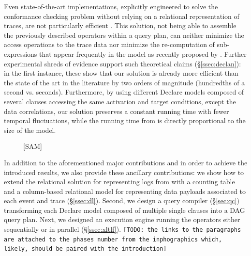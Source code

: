 Even state-of-the-art implementations, explicitly engineered to solve the conformance checking problem without relying on a 
relational representation of traces, are not particularly efficient \cite{BurattinMS16}. This solution, not being able to assemble the previously described \LTLf operators within a query plan, can neither minimize the access operations to the trace data nor  minimize the re-computation of sub-expressions that appear frequently in the model as recently proposed by \cite{BellatrecheKB21}. Further experimental shreds of evidence support such theoretical claims (\S\ref{ssec:declan}): in the first instance, these show that our solution is already more efficient than the state of the art in the literature by two orders of magnitude (hundredths of a second vs. seconds). Furthermore, by using different Declare models composed of several clauses accessing the same activation and target conditions, except the data correlations, our solution preserves a constant running time with fewer temporal fluctuations, while the running time from  \cite{BurattinMS16} is directly proportional to the size of the model.

\begin{figure}
	\caption{[SAM]}\label{fig:pipe}
\end{figure}
In addition to the aforementioned major contributions and in order to achieve the introduced results, we also provide these ancillary contributions: we show how to extend the relational solution for representing logs from \cite{Schonig15,SchonigRCJM16} with a counting table and a column-based relational model for representing data payloads associated to each event and trace (\S\ref{ssec:dl}). Second, we design a query compiler (\S\ref{sec:qc}) transforming each Declare model composed of multiple single clauses into a DAG query plan. Next, we designed an execution engine running the \xLTLf operators either sequentially or in parallel (\S\ref{ssec:xltlf}). \texttt{\color{red}[TODO: the links to the paragraphs are attached to the phases number from the inphographics which, likely, should be paired with the introduction]}